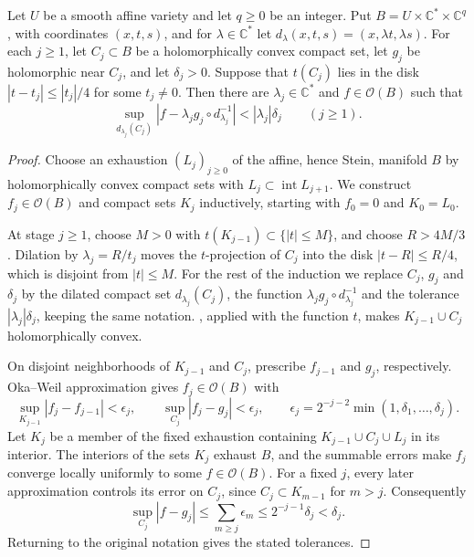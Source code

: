 \begin{lemma}\label{lem:dilated-countable-holomorphic-tests}
Let $U$ be a smooth affine variety and let $q\geq0$ be an integer. Put $B=U\times\mathbb C^*\times\mathbb C^q$, with coordinates $(x,t,s)$, and for $\lambda\in\mathbb C^*$ let $d_\lambda(x,t,s)=(x,\lambda t,\lambda s)$. For each $j\geq1$, let $C_j\subset B$ be a holomorphically convex compact set, let $g_j$ be holomorphic near $C_j$, and let $\delta_j>0$. Suppose that $t(C_j)$ lies in the disk $|t-t_j|\leq|t_j|/4$ for some $t_j\neq0$. Then there are $\lambda_j\in\mathbb C^*$ and $f\in\mathcal O(B)$ such that
\[
 \sup_{d_{\lambda_j}(C_j)}
 |f-\lambda_j g_j\circ d_{\lambda_j}^{-1}|<|\lambda_j|\delta_j
 \qquad(j\geq1).
\]
\end{lemma}
\begin{proof}
Choose an exhaustion $(L_j)_{j\geq0}$ of the affine, hence Stein, manifold $B$ by holomorphically convex compact sets with $L_j\subset\operatorname{int}L_{j+1}$. We construct $f_j\in\mathcal O(B)$ and compact sets $K_j$ inductively, starting with $f_0=0$ and $K_0=L_0$.

At stage $j\geq1$, choose $M>0$ with $t(K_{j-1})\subset\{|t|\leq M\}$, and choose $R>4M/3$. Dilation by $\lambda_j=R/t_j$ moves the $t$-projection of $C_j$ into the disk $|t-R|\leq R/4$, which is disjoint from $|t|\leq M$. For the rest of the induction we replace $C_j$, $g_j$ and $\delta_j$ by the dilated compact set $d_{\lambda_j}(C_j)$, the function $\lambda_jg_j\circ d_{\lambda_j}^{-1}$ and the tolerance $|\lambda_j|\delta_j$, keeping the same notation. , applied with the function $t$, makes $K_{j-1}\cup C_j$ holomorphically convex.

On disjoint neighborhoods of $K_{j-1}$ and $C_j$, prescribe $f_{j-1}$ and $g_j$, respectively. Oka--Weil approximation gives $f_j\in\mathcal O(B)$ with
\[
 \sup_{K_{j-1}}|f_j-f_{j-1}|<\epsilon_j,
 \qquad \sup_{C_j}|f_j-g_j|<\epsilon_j,
 \qquad
 \epsilon_j=2^{-j-2}\min(1,\delta_1,\ldots,\delta_j).
\]
Let $K_j$ be a member of the fixed exhaustion containing $K_{j-1}\cup C_j\cup L_j$ in its interior. The interiors of the sets $K_j$ exhaust $B$, and the summable errors make $f_j$ converge locally uniformly to some $f\in\mathcal O(B)$. For a fixed $j$, every later approximation controls its error on $C_j$, since $C_j\subset K_{m-1}$ for $m>j$. Consequently
\[
 \sup_{C_j}|f-g_j|
 \leq\sum_{m\geq j}\epsilon_m
 \leq2^{-j-1}\delta_j<\delta_j.
\]
Returning to the original notation gives the stated tolerances.
\end{proof}

